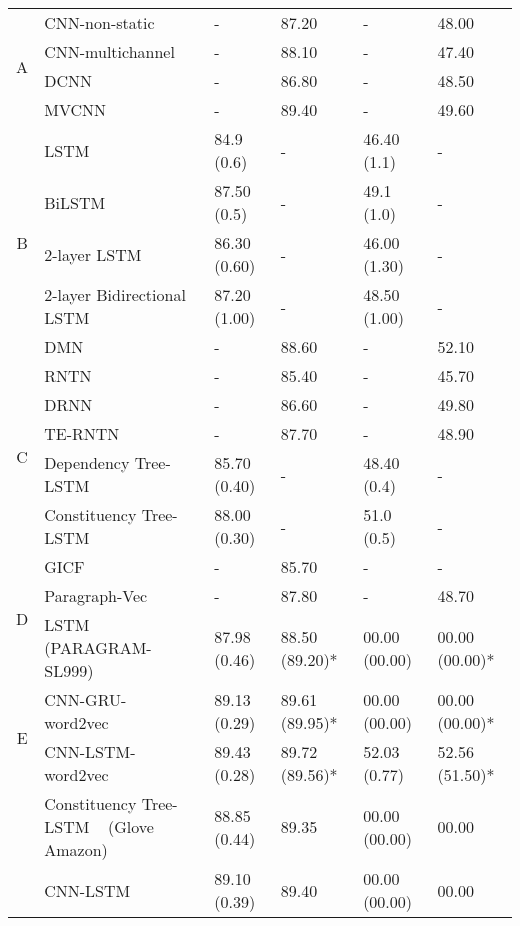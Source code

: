 \begin{table*}[]
\begin{tabular}{|c|l|ll|ll|}
		\multirow{4}{*}{A} & CNN-non-static~\cite{KimCNN} & - & 87.20 & - & 48.00 \Tstrut \\
		& CNN-multichannel~\cite{KimCNN} & - & 88.10 & - & 47.40\\
		& DCNN~\cite{DCNN} & - & 86.80 & - & 48.50 \\
		& MVCNN~\cite{2-layer-cnn} & - & 89.40 & - & 49.60 \\
		\hline
		\multirow{5}{*}{B} & LSTM~\cite{treeLSTM}   & 84.9 (0.6) & - & 46.40 (1.1)& - \\
		& BiLSTM~\cite{treeLSTM}  & 87.50 (0.5) & - & 49.1 (1.0) & -  \\
		& 2-layer LSTM~\cite{treeLSTM} & 86.30 (0.60) & - & 46.00 (1.30) & -\\
		& 2-layer Bidirectional LSTM~\cite{treeLSTM} & 87.20 (1.00) & - & 48.50 (1.00) & -\\
		& DMN~\cite{attention-gru} & - & 88.60 & - & 52.10 \\
		\hline
		\multirow{5}{*}{C} & RNTN~\cite{socher2013recursive}  & - & 85.40 & - & 45.70 \\
		& DRNN~\cite{IrsoyDRNN} & - & 86.60 & - & 49.80  \\
		& TE-RNTN~\cite{tag-embedding-rnn} & - & 87.70 & - & 48.90\\
		& Dependency Tree-LSTM~\cite{treeLSTM}  & 85.70 (0.40)  & - & 48.40 (0.4) & - \\
		& Constituency Tree-LSTM~\cite{treeLSTM} & 88.00 (0.30)    &  - & 51.0 (0.5) & - \\
		\hline
		\multirow{3}{*}{D} & GICF~\cite{group-instance} & - & 85.70 & - & - \\
		& Paragraph-Vec~\cite{ParagraphVec} & - & 87.80 & - & 48.70 \\
		& LSTM (PARAGRAM-SL999)~\cite{wieting2015towards} & 87.98 (0.46) & 88.50 (89.20)* & 00.00 (00.00)  & 00.00 (00.00)*
		\\
		\hline
		\multirow{2}{*}{E}  & CNN-GRU-word2vec~\cite{cnn-rnn}                    & 89.13 (0.29)  &  89.61 (89.95)* & 00.00 (00.00) & 00.00 (00.00)*   \\
		& CNN-LSTM-word2vec~\cite{cnn-rnn}                    & 89.43 (0.28)  & 89.72 (89.56)* & 52.03 (0.77) & 52.56 (51.50)* \Bstrut    \\
		\Xhline{3\arrayrulewidth}
		\Xhline{3\arrayrulewidth}
		\multirow{6}{*}{F} & Constituency Tree-LSTM ~\cite{treeLSTM} (Glove Amazon) & 88.85 (0.44) & 89.35 & 00.00 (00.00) & 00.00 \Tstrut \\
		 & CNN-LSTM                                 & 89.10 (0.39)  & 89.40 & 00.00 (00.00) & 00.00 \\

\end{tabular}
\end{table*}
